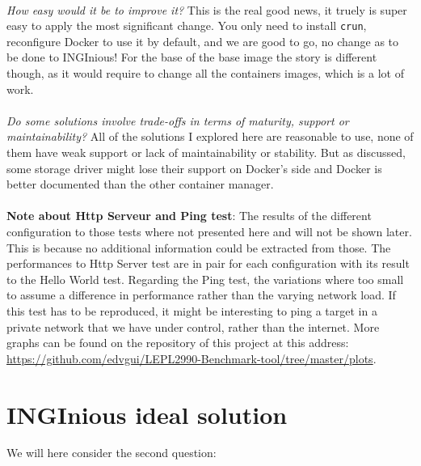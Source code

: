 \paragraph{}\textit{How easy would it be to improve it?}  This is the real good news, it truely is super easy to apply the most significant change.  You only need to install \texttt{crun}, reconfigure Docker to use it by default, and we are good to go, no change as to be done to INGInious!  For the base of the base image the story is different though, as it would require to change all the containers images, which is a lot of work.
\paragraph{}\textit{Do some solutions involve trade-offs in terms of maturity, support or maintainability?}  All of the solutions I explored here are reasonable to use, none of them have weak support or lack of maintainability or stability.  But as discussed, some storage driver might lose their support on Docker's side and Docker is better documented than the other container manager.

\paragraph{}\textbf{Note about Http Serveur and Ping test}:  The results of the different configuration to those tests where not presented here and will not be shown later.  This is because no additional information could be extracted from those.  The performances to Http Server test are in pair for each configuration with its result to the Hello World test.  Regarding the Ping test, the variations where too small to assume a difference in performance rather than the varying network load.  If this test has to be reproduced, it might be interesting to ping a target in a private network that we have under control, rather than the internet. More graphs can be found on the repository of this project at this address: \href{https://github.com/edvgui/LEPL2990-Benchmark-tool/tree/master/plots}{https://github.com/edvgui/LEPL2990-Benchmark-tool/tree/master/plots}.

\section{INGInious ideal solution}
We will here consider the second question:
\begin{center}
\end{center}

